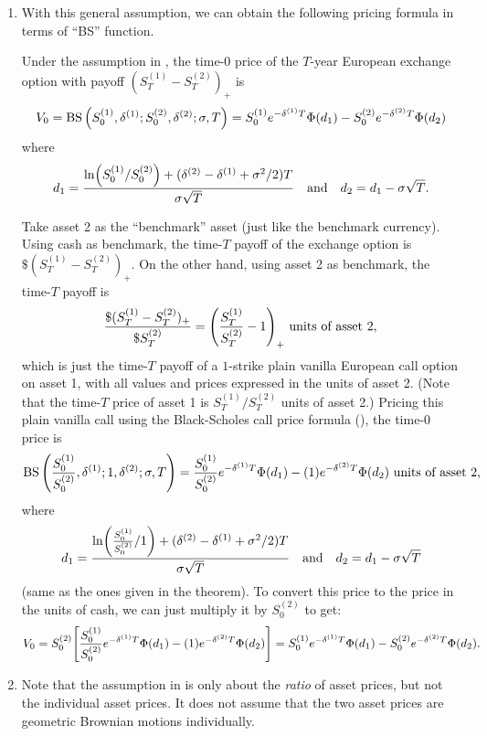 \begin{enumerate}
\item With this general assumption, we can obtain the following pricing formula
in terms of ``BS'' function.

\begin{theorem}
\label{thm:11-exchange-opt-fmla}
Under the assumption in , the time-0 price of the
\(T\)-year European exchange option with payoff \((S_T^{(1)}-S_T^{(2)})_{+}\)
is
\[
V_0=\operatorname{BS}\qty(S_0^{(1)},\delta^{(1)};S_0^{(2)},\delta^{(2)};\sigma,T)
=S_0^{(1)}e^{-\delta^{(1)}T}\Phi(d_1)-S_0^{(2)}e^{-\delta^{(2)}T}\Phi(d_2)
\]
where
\[
d_1=\frac{\ln(S_0^{(1)}/S_0^{(2)})+(\delta^{(2)}-\delta^{(1)}+\sigma^2/2)T}{\sigma\sqrt{T}}\qqtext{and}
d_2=d_1-\sigma\sqrt{T}.
\]
\end{theorem}
\begin{pf}
Take asset 2 as the ``benchmark'' asset (just like the benchmark currency).
Using cash as benchmark, the time-\(T\) payoff of the exchange option is
\(\$(S_T^{(1)}-S_T^{(2)})_{+}\). On the other hand, using asset 2 as benchmark, the
time-\(T\) payoff is
\[
\frac{\$(S_T^{(1)}-S_T^{(2)})_{+}}{\$ S_T^{(2)}}=
\qty(\frac{S_T^{(1)}}{S_T^{(2)}}-1)_{+}\text{ units of asset 2},
\]
which is just the time-\(T\) payoff of a \(1\)-strike plain vanilla European
call option on asset 1, with all values and prices expressed in the units of
asset 2. (Note that the time-\(T\) price of asset 1 is \(S_T^{(1)}/S_T^{(2)}\)
units of asset 2.) Pricing this plain vanilla call using the Black-Scholes call
price formula (), the time-0 price is
\[
\operatorname{BS}\qty(\frac{S_0^{(1)}}{S_0^{(2)}},\delta^{(1)};1,\delta^{(2)};\sigma,T)
=\frac{S_0^{(1)}}{S_0^{(2)}}e^{-\delta^{(1)}T}\Phi(d_1)-(1)e^{-\delta^{(2)}T}\Phi(d_2)
\text{ units of asset 2},
\]
where
\[
d_1=\frac{\ln(\frac{S_0^{(1)}}{S_0^{(2)}}/1)+(\delta^{(2)}-\delta^{(1)}+\sigma^2/2)T}{\sigma\sqrt{T}}\qqtext{and}
d_2=d_1-\sigma\sqrt{T}
\]
(same as the ones given in the theorem). To convert this price to the price in
the units of cash, we can just multiply it by \(S_0^{(2)}\) to get:
\[
V_0=S_0^{(2)}\qty[\frac{S_0^{(1)}}{S_0^{(2)}}e^{-\delta^{(1)}T}\Phi(d_1)-(1)e^{-\delta^{(2)}T}\Phi(d_2)]
=S_0^{(1)}e^{-\delta^{(1)}T}\Phi(d_1)-S_0^{(2)}e^{-\delta^{(2)}T}\Phi(d_2).
\]
\end{pf}

\item \label{it:blended-vol-fmla}
Note that the assumption in  is only about the
\emph{ratio} of asset prices, but not the individual asset prices. It does not
assume that the two asset prices are geometric Brownian motions individually.


\end{enumerate}

